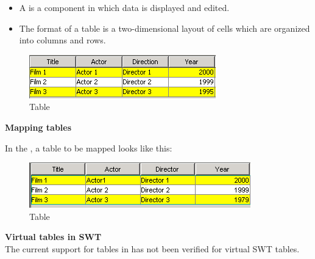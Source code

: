\begin{itemize}
\item A  is a component in which data is displayed and edited. 
\item The format of a table is a two-dimensional layout of cells which are organized into columns and rows.
\end{itemize}


\begin{figure}
\begin{center}
\includegraphics{PS/Table}
\caption{Table}
\label{table}
\end{center}
\end{figure}

\textbf{Mapping tables}

In the \gdomm{}, a table to be mapped looks like this:

\begin{figure}
\begin{center}
\includegraphics{PS/Maptable}
\caption{Table}
\label{maptable}
\end{center}
\end{figure}

\textbf{Virtual tables in SWT}\\
The current support for tables in \app{} has not been verified for virtual SWT tables.
